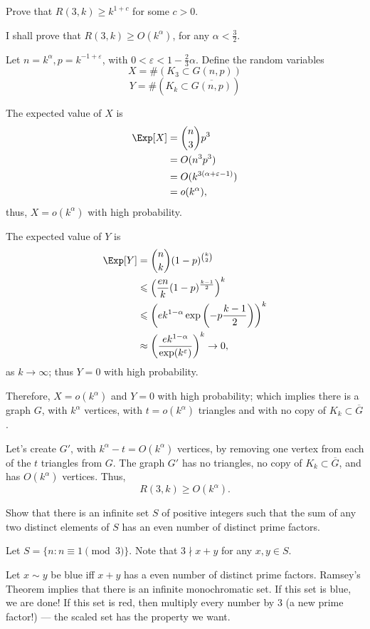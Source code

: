 \documentclass[10pt, a4paper]{article}
\begin{document}
\newpage
\begin{prob}
	Prove that $R(3, k) \geqslant k^{1+c}$ for some $c > 0$.
\end{prob}
\begin{sol}
	I shall prove that $R(3, k) \geqslant O(k^\alpha)$, for any $\alpha < \frac{3}{2}$.

	Let $n = k^\alpha, p = k^{-1 + \varepsilon}$, with $0 < \varepsilon < 1 - \frac{2}{3}\alpha$. Define the random variables
	\[
		X = \#(K_3 \subset G(n, p))
	\]
	\[
		Y = \#(K_k \subset \overline{G(n, p)})
	\]

	The expected value of $X$ is \begin{align*}
		\Exp[X] &= \binom{n}{3} p^3 \\&= O(n^3p^3) \\&= O(k^{3(\alpha + \varepsilon - 1)}) \\&= o(k^\alpha),
	\end{align*}
	thus, $X = o(k^\alpha)$ with high probability.

	The expected value of $Y$ is \begin{align*}
		\Exp[Y] &= \binom{n}{k}(1-p)^{\binom{k}{2}} \\&\leqslant \left(\frac{en}{k}(1-p)^{\frac{k-1}{2}}\right)^k\\
		&\leqslant \left( ek^{1-\alpha} \exp\left(-p\frac{k-1}{2}\right)\right)^k \\
		&\approx \left( \frac{ek^{1-\alpha}}{\exp(k^\varepsilon)} \right)^k \to 0,
	\end{align*}
	as $k \to \infty$; thus $Y = 0$ with high probability.

	Therefore, $X = o(k^\alpha)$ and $Y = 0$ with high probability; which implies there is a graph $G$, with $k^\alpha$ vertices, with $t = o(k^\alpha)$ triangles and with no copy of $K_k \subset \overline G$. 

	Let's create $G'$, with $k^\alpha - t = O(k^\alpha)$ vertices, by removing one vertex from each of the $t$ triangles from $G$. The graph $G'$ has no triangles, no copy of $K_k \subset \overline G$, and has $O(k^\alpha)$ vertices. Thus, \[
		R(3, k) \geqslant O(k^\alpha).
	\]
\end{sol}

\newpage
\begin{prob}
	Show that there is an infinite set $S$ of positive integers such that the sum of any two distinct elements of $S$ has an even number of distinct prime factors.
\end{prob}
\begin{sol}
	Let $S = \{n : n \equiv 1 \pmod{3}\}$. Note that $3 \nmid x + y$ for any $x, y \in S$.

	Let $x \sim y$ be blue iff $x + y$ has a even number of distinct prime factors. Ramsey's Theorem implies that there is an infinite monochromatic set. If this set is blue, we are done! If this set is red, then multiply every number by $3$ (a new prime factor!) --- the scaled set has the property we want.
\end{sol}
\end{document}
